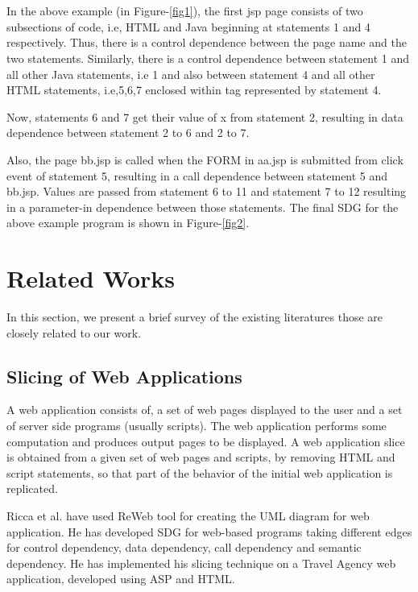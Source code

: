 \documentclass[11pt]{article}   %
\begin{document}
\\\\
In the above example (in Figure-\ref{fig1}), the first jsp page consists of two subsections of code, i.e, HTML and Java beginning at statements 1 and 4 respectively. Thus, there is a control dependence between the page name and the two statements. Similarly, there is a control dependence between statement 1 and all other Java statements, i.e 1 and also between statement 4 and all other HTML statements, i.e,5,6,7 enclosed within tag represented by statement 4.

Now, statements 6 and 7 get their value of x from statement 2, resulting in data dependence between statement 2 to 6 and 2 to 7.

Also, the page bb.jsp is called when the FORM in aa.jsp is submitted from click event of statement 5, resulting in a call dependence between statement 5 and bb.jsp.
Values are passed from statement 6 to 11 and statement 7 to 12 resulting in a parameter-in dependence between those statements. The final SDG for the above example program is shown in Figure-\ref{fig2}.
 
\section{Related Works}
In this section, we present a brief survey of the existing literatures those are closely related to our work.

\subsection{Slicing of Web Applications}
\par A web application consists of, a set of web pages displayed to the user and a set of server side programs (usually scripts). The web application performs some computation and produces output pages to be displayed. A web application slice is obtained from a given set of web pages and scripts, by removing HTML and script statements, so that part of the behavior of the initial web application is replicated.

\par Ricca et al. \cite{ricca2002construction} have used ReWeb tool for creating the UML diagram for web application. He has developed SDG for web-based programs taking different edges for control dependency, data dependency, call dependency and semantic dependency. He has implemented his slicing technique on a Travel Agency web application, developed using ASP and HTML.
\end{document}

